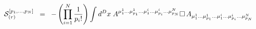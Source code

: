 \begin{equation}
{\cal{S}}_{(r)}^{[ p_1 ,..., p_N ]} \;\; =\;\; - \left( \prod_{i=1}^{N}
\frac{1}{p_i !}
\right) \int d^D x \; A^{{\mu}^1_1 ...{\mu}^1_{p_1} ...{\mu}^i_1
...{\mu}^i_{p_i}
...{\mu}^N_{p_N} } \square \, A_{{\mu}^1_1 ...{\mu}^1_{p_1}
...{\mu}^i_1 ...{\mu}^i_{p_i}
...{\mu}^N_{p_N} }
\label{eq:1.1a}
\end{equation}

